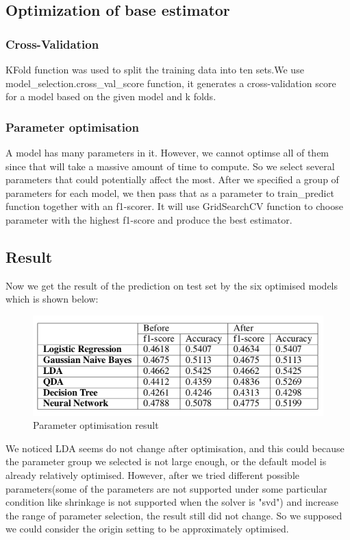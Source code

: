 \documentclass{article}
\begin{document}
\subsection{Optimization of base estimator}

\subsubsection{Cross-Validation}
KFold function was used to split the training data into ten sets.We use model\_selection.cross\_val\_score function, it generates a cross-validation score for a model based on the given model and k folds. 

\subsubsection{Parameter optimisation}
A model has many parameters in it. However, we cannot optimse all of them since that will take a massive amount of time to compute. So we select several parameters that could potentially affect the most.
After we specified a group of parameters for each model, we then pass that as a parameter to train\_predict function together with an f1-scorer. It will use GridSearchCV function to choose parameter with the highest f1-score and produce the best estimator. 

\subsection{Result}
Now we get the result of the prediction on test set by the six optimised models which is shown below:\\
\begin{figure}[ht]
\centering
\includegraphics[scale=1]{graphs/result_table.png}
\caption{Parameter optimisation result}
\label{fig:confusion_matrix}
\end{figure}

We noticed LDA seems do not change after optimisation, and this could because the parameter group we selected is not large enough, or the default model is already relatively optimised. However, after we tried different possible parameters(some of the parameters are not supported under some particular condition like shrinkage is not supported when the solver is "svd") and increase the range of parameter selection, the result still did not change. So we supposed we could consider the origin setting to be approximately optimised.
\end{document}
